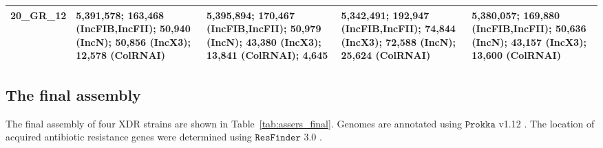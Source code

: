 \begin{landscape}
\begin{table}[!hpt]
\begin{tabular}{|c|p{5cm}|p{5cm}|p{5cm}|p{5cm}|}
20\_GR\_12              & \textbf{5,391,578}; \textbf{163,468 (IncFIB,IncFII)}; \textbf{50,940 (IncN)}; 50,856 (IncX3); 12,578 (ColRNAI)                                     & \textbf{5,395,894}; \textbf{170,467 (IncFIB,IncFII)}; \textbf{50,979 (IncN)}; \textbf{43,380 (IncX3)}; \textbf{13,841 (ColRNAI)}; 4,645                                                                   & 5,342,491; \textbf{192,947 (IncFIB,IncFII)}; 74,844 (IncX3); 72,588 (IncN); 25,624 (ColRNAI)                                & \textbf{5,380,057}; \textbf{169,880 (IncFIB,IncFII)}; \textbf{50,636 (IncN)}; \textbf{43,157 (IncX3)}; 13,600 (ColRNAI)                                          \\ \hline
\end{tabular}
\end{table}
\end{landscape}

\subsection{The final assembly}
The final assembly of four XDR \kp{} strains are shown in Table~\ref{tab:assers_final}. 
Genomes are annotated using $\mathtt{Prokka}$ v1.12 \cite{Seemann2014}. The location of acquired antibiotic resistance genes were determined using $\mathtt{ResFinder}$ 3.0 \cite{ZankariHC2012}. 

